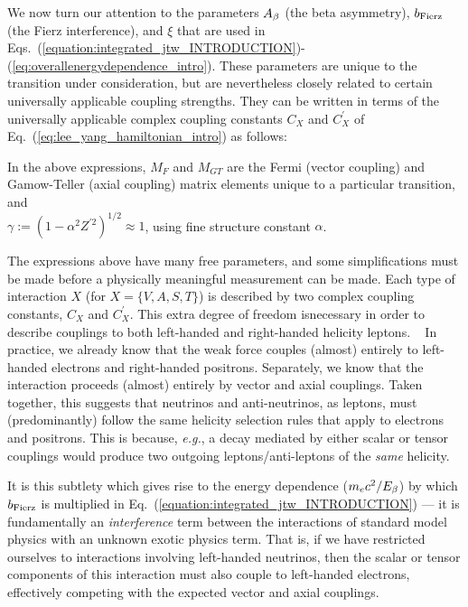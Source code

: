We now turn our attention to the parameters $A_{\beta}$ (the beta asymmetry), $b_{\mathrm{Fierz}}$ (the Fierz interference), and $\xi$ that are used in Eqs.~(\ref{equation:integrated_jtw_INTRODUCTION})-(\ref{eq:overallenergydependence_intro}).  These parameters are unique to the transition under consideration, but are nevertheless closely related to certain universally applicable coupling strengths.  They can be written in terms of the universally applicable complex coupling constants $C_X$ and $C_X^{\prime}$ of Eq.~(\ref{eq:lee_yang_hamiltonian_intro})
as follows: 


In the above expressions, $M_F$ and $M_{GT}$ are the Fermi (vector coupling) and Gamow-Teller (axial coupling) matrix elements unique to a particular transition,~ and 
\\
\mbox{$\gamma := \left( 1-\alpha^2 Z^{\prime 2} \right)^{1/2} \approx 1$}, using fine structure constant $\alpha$.

The expressions above have many free parameters, and some simplifications must be made before a physically meaningful measurement can be made.  Each type of interaction $X$ (for $X=\{V,A,S,T\}$) is described by two complex coupling constants, $C_X$ and $C_X^\prime$.  This extra degree of freedom isnecessary in order to describe couplings to both left-handed and right-handed helicity leptons.
~
In practice, we already know that the weak force couples (almost) entirely to left-handed electrons and right-handed positrons.  Separately, we know that the interaction proceeds (almost) entirely by vector and axial couplings.  Taken together, this suggests that neutrinos and anti-neutrinos, as leptons, must (predominantly) follow the same helicity selection rules that apply to electrons and positrons.  This is because, \emph{e.g.}, a decay mediated by either scalar or tensor couplings would produce two outgoing leptons/anti-leptons of the \emph{same} helicity.  

It is this subtlety which gives rise to the energy dependence ($m_e c^2 / E_{\beta} $) by which $b_{\mathrm{Fierz}}$ is multiplied in Eq.~(\ref{equation:integrated_jtw_INTRODUCTION}) --- it is fundamentally an \emph{interference} term between the interactions of standard model physics with an unknown exotic physics term.  That is, if we have restricted ourselves to interactions involving left-handed neutrinos, then the scalar or tensor components of this interaction must also couple to left-handed electrons, effectively competing with the expected vector and axial couplings.  

